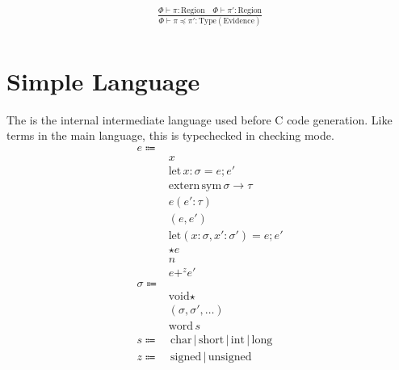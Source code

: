 \documentclass {article}
\begin{document}
\begin{gather*}
\frac
{\Phi \vdash \pi : \text{Region} \quad \Phi \vdash \pi' : \text{Region}}
{\Phi \vdash \pi \preceq \pi' : \text{Type}(\text{Evidence})} \\
\end{gather*}

\section{Simple Language}
The is the internal intermediate language used before C code generation.
Like terms in the main language, this is typechecked in checking mode.
\begin{align*}
e \Coloneqq & \\
& x \\
& \text{let} \, x : \sigma = e; e' \\
& \text{extern} \, \text{sym} \, \sigma \to \tau \\
& e(e' : \tau) \\
& (e,e') \\
& \text{let} (x: \sigma, x' : \sigma') = e; e' \\
& \star e \\
& n \\
& e +^z e' \\
\sigma \Coloneqq & \\
& \text{void}\star \\ 
& (\sigma, \sigma', \dots) \\
& \text{word} \, s \\
s \Coloneqq & \, \text{char} \, | \, \text{short} \, | \, \text{int} \, | \, \text{long} \\
z \Coloneqq & \, \text{signed} \, | \, \text{unsigned}
\end{align*}
\end{document}
